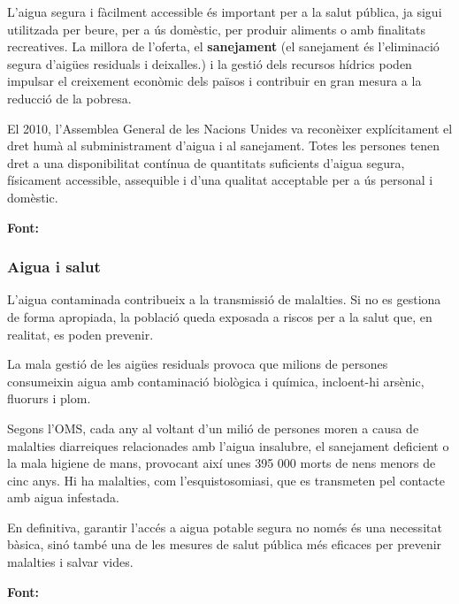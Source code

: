 
L'aigua segura i fàcilment accessible és important per a la salut pública, ja sigui utilitzada per beure, per a ús domèstic, per produir aliments o amb finalitats recreatives. La millora de l'oferta, el \textbf{sanejament} (el sanejament és l’eliminació segura d’aigües residuals i deixalles.) i la gestió dels recursos hídrics poden impulsar el creixement econòmic dels països i contribuir en gran mesura a la reducció de la pobresa.

El 2010, l'Assemblea General de les Nacions Unides va reconèixer explícitament el dret humà al subministrament d'aigua i al sanejament. Totes les persones tenen dret a una disponibilitat contínua de quantitats suficients d'aigua segura, físicament accessible, assequible i d'una qualitat acceptable per a ús personal i domèstic.

\textbf{Font:}~\cite{OrgaMS}

\subsubsection{Aigua i salut}
L’aigua contaminada contribueix a la transmissió de malalties.
Si no es gestiona de forma apropiada, la població queda exposada a riscos per a la salut que, en realitat, es poden prevenir.

La mala gestió de les aigües residuals provoca que milions de persones consumeixin aigua amb contaminació biològica i química, incloent-hi arsènic, fluorurs i plom.

Segons l’OMS, cada any al voltant d’un milió de persones moren a causa de malalties diarreiques relacionades amb l’aigua insalubre, el sanejament deficient o la mala higiene de mans, provocant així unes 395 000 morts de nens menors de cinc anys. Hi ha malalties, com l’esquistosomiasi, que es transmeten pel contacte amb aigua infestada.

En definitiva, garantir l’accés a aigua potable segura no només és una necessitat bàsica, sinó també una de les mesures de salut pública més eficaces per prevenir malalties i salvar vides.

\textbf{Font:}~\cite{OMS2}

